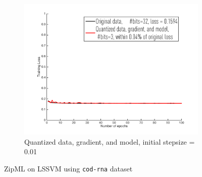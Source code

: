 \documentclass{article}
\begin{document}
\begin{figure}[h]
\begin{subfigure}[h]{.3\columnwidth}
    \includegraphics[width=\columnwidth]{lssvm/cod-rna/dgm001}
     \caption{Quantized data, gradient, and model, initial stepsize = 0.01}
    \end{subfigure}
    
\caption{ZipML on LSSVM using \texttt{cod-rna} dataset}
\label{fig:lssvmcodrna}
\end{figure}
\end{document}
